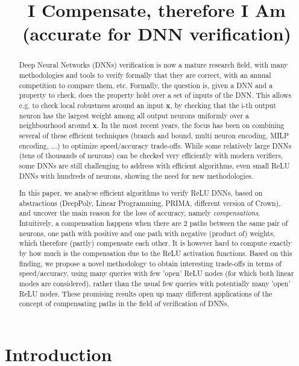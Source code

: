 \documentclass{llncs}
\title{I Compensate, therefore I Am \\ (accurate for DNN verification)}
\date{}
\newcommand{\vx}{\boldsymbol{x}}
\begin{document}
	
	\maketitle
	
	\begin{abstract}
		Deep Neural Networks (DNNs) verification is now a mature research field, with many methodologies and tools to verify formally that they are correct, with an annual competition to compare them, etc. Formally, the question is, given a DNN and a property to check, does the property hold over a set of inputs of the DNN. This allows e.g. to check local robustness around an input $\vx$, by checking that the i-th output neuron has the largest weight among all output neurons uniformly over a neighbourhood around $\vx$. In the most recent years, the focus has been on combining several of these efficient techniques (branch and bound, multi neuron encoding, MILP encoding, ...) to optimize speed/accuracy trade-offs. While some relatively large DNNs (tens of thousands of neurons) can be checked very efficiently with modern verifiers, some DNNs are still challenging to address with efficient algorithms, even small ReLU DNNs with hundreds of neurons, showing the need for new methodologies.
		
		In this paper, we analyse efficient algorithms to verify ReLU DNNs, based on abstractions (DeepPoly, Linear Programming, PRIMA, different version of Crown), and uncover the main reason for the loss of accuracy, namely {\em compensations}. Intuitively, a compensation happens when there are 2 paths between the same pair of neurons, one path with positive and one path with negative (product of) weights, which therefore (partly) compensate each other. It is however hard to compute exactly by how much is the compensation due to the ReLU activation functions. Based on this finding, we propose a novel methodology to obtain interesting trade-offs in terms of speed/accuracy, using many queries with few 'open' ReLU nodes (for which both linear modes are considered), rather than the usual few queries with potentially many 'open' ReLU nodes. These promising results open up many different applications of the concept of compensating paths in the field of verification of DNNs.  
	\end{abstract}
	
	
	\section{Introduction}
	
\end{document}
